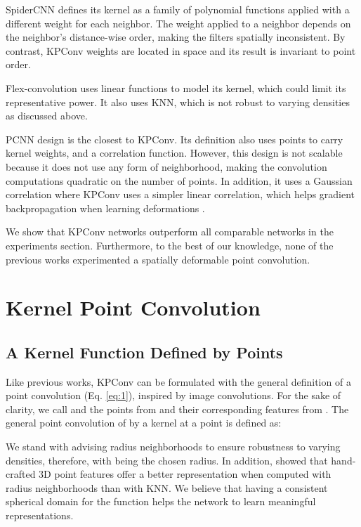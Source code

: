 \documentclass[10pt,twocolumn,letterpaper]{article}
\begin{document}
SpiderCNN \cite{xu2018spidercnn} defines its kernel as a family of polynomial functions applied with a different weight for each neighbor. The weight applied to a neighbor depends on the neighbor's distance-wise order, making the filters spatially inconsistent. By contrast, KPConv weights are located in space and its result is invariant to point order.

Flex-convolution \cite{groh2018flex} uses linear functions to model its kernel, which could limit its representative power. It also uses KNN, which is not robust to varying densities as discussed above.

PCNN \cite{atzmon2018point} design is the closest to KPConv. Its definition also uses points to carry kernel weights, and a correlation function. However, this design is not scalable because it does not use any form of neighborhood, making the convolution computations quadratic on the number of points. In addition, it uses a Gaussian correlation where KPConv uses a simpler linear correlation, which helps gradient backpropagation when learning deformations \cite{dai2017deformable}.

We show that KPConv networks outperform all comparable networks in the experiments section. Furthermore, to the best of our knowledge, none of the previous works experimented a spatially deformable point convolution.

\section{Kernel Point Convolution}

\subsection{A Kernel Function Defined by Points}

Like previous works, KPConv can be formulated with the general definition of a point convolution (Eq. \ref{eq:1}), inspired by image convolutions. For the sake of clarity, we call  and  the points from  and their corresponding features from . The general point convolution of  by a kernel  at a point  is defined as:



We stand with \cite{hermosilla2018monte} advising radius neighborhoods to ensure robustness to varying densities, therefore,  with  being the chosen radius. In addition, \cite{thomas2018semantic} showed that hand-crafted 3D point features offer a better representation when computed with radius neighborhoods than with KNN. We believe that having a consistent spherical domain for the function  helps the network to learn meaningful representations. 
    
\end{document}
